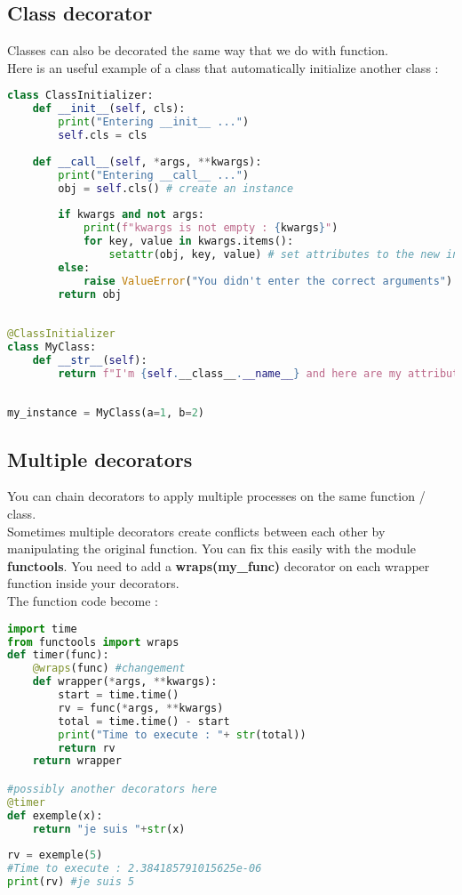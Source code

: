 \documentclass[a4paper, 12pt, titlepage]{scrartcl} %
\begin{document}
\subsection{Class decorator}
Classes can also be decorated the same way that we do with function.\\
Here is an useful example of a class that automatically initialize another class :
\begin{lstlisting}[language=Python]
class ClassInitializer:
    def __init__(self, cls):
        print("Entering __init__ ...")
        self.cls = cls
 
    def __call__(self, *args, **kwargs):
        print("Entering __call__ ...")
        obj = self.cls() # create an instance
 
        if kwargs and not args:
            print(f"kwargs is not empty : {kwargs}")
            for key, value in kwargs.items():
                setattr(obj, key, value) # set attributes to the new instance
        else:
            raise ValueError("You didn't enter the correct arguments")
        return obj
 
 
@ClassInitializer
class MyClass:
    def __str__(self):
        return f"I'm {self.__class__.__name__} and here are my attributes : {self.__dict__}"
 
 
my_instance = MyClass(a=1, b=2)
\end{lstlisting} \vspace{5mm}

\subsection{Multiple decorators}
You can chain decorators to apply multiple processes on the same function / class. \\
Sometimes multiple decorators create conflicts between each other by manipulating the original function. You can fix this easily with the module \textbf{functools}. You need to add a \textbf{wraps(my\_func)} decorator on each wrapper function inside your decorators.\\

The function code become :
\begin{lstlisting}[language=Python]
import time
from functools import wraps
def timer(func):
    @wraps(func) #changement
	def wrapper(*args, **kwargs):
		start = time.time()
		rv = func(*args, **kwargs)
		total = time.time() - start
		print("Time to execute : "+ str(total))
		return rv
	return wrapper

#possibly another decorators here
@timer
def exemple(x):
	return "je suis "+str(x)
	
rv = exemple(5)
#Time to execute : 2.384185791015625e-06
print(rv) #je suis 5
\end{lstlisting} \vspace{5mm}
\end{document}
